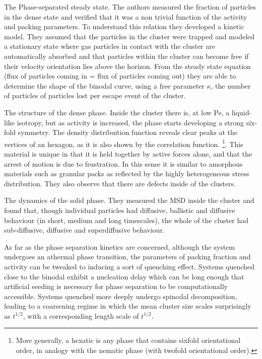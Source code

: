 \documentclass[a4paper]{article}
\begin{document}
The Phase-separated steady state. The authors measured the fraction of particles in the dense state and verified that it was a non trivial function of the activity and packing parameters. To understand this relation they developed a kinetic model. They assumed that the particles in the cluster were trapped and modeled a stationary state where gas particles in contact with the cluster are automatically absorbed and that particles within the cluster can become free if their velocity orientation lies above the horizon. From the steady state equation (flux of particles coming in = flux of particles coming out) they are able to determine the shape of the binodal curve, using a free parameter $\kappa$, the number of particles of particles lost per escape event of the cluster.

The structure of the dense phase. Inside the cluster there is, at low Pe, a liquid-like isotropy, but as activity is increased, the phase starts developing a strong six-fold symmetry. The density distribuition function reveals clear peaks at the vertices of an hexagon, as it is also shown by the correlation function. \footnote{ More generally, a hexatic is any phase that contains sixfold orientational order, in analogy with the nematic phase (with twofold orientational order).}. This material is unique in that it is held together by active forces alone, and that the arrest of motion is due to frustration. In this sense it is similar to amorphous materials such as granular packs as reflected by the highly heterogeneous stress distribution. They also observe that there are defects inside of the clusters.

The dynamics of the solid phase. They measured the MSD inside the cluster and found that, though individual particles had diffusive, ballistic and diffusive behaviour (in short, medium and long timescales), the whole of the cluster had sub-diffusive, diffusive and superdiffusive behaviour.

As far as the phase separation kinetics are concerned, although the system undergoes an athermal phase transition, the parameters of packing fraction and activity can be tweaked to inducing a sort of quenching effect. Systems quenched close to the binodal exhibit a nucleation delay which can be long enough that artificial seeding is necessary for phase separation to be computationally accessible. Systems quenched more deeply undergo spinodal decomposition, leading to a coarsening regime in which the mean cluster size scales surprisingly as $t^{1/2}$, with a corresponding length scale of $t^{1/2}$.
\end{document}
